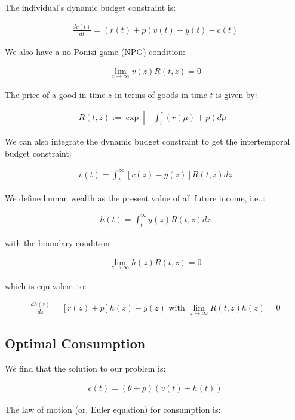 \documentclass[10pt]{article}
\begin{document}
The individual's dynamic budget constraint is:

\begin{align}
    \frac{d v(t)}{d t}=(r(t)+p) v(t)+y(t)-c(t)
\end{align}

We also have a no-Ponizi-game (NPG) condition:

\begin{align}
    \lim _{z \rightarrow \infty} v(z) R(t, z)=0
\end{align}

The price of a good in time $z$ in terms of goods in time $t$ is
given by:

\begin{align}
    R(t, z):=\exp \left[-\int_t^z(r(\mu)+p) d \mu\right]
\end{align}

We can also integrate the dynamic budget constraint to get
the intertemporal budget constraint:

\begin{align}
    v(t)=\int_t^{\infty}[c(z)-y(z)] R(t, z) d z
\end{align}

We define human wealth as the present value of 
all future income, i.e.,:

\begin{align}
    h(t)=\int_t^{\infty} y(z) R(t, z) d z
\end{align}

with the boundary condition

\begin{align}
    \lim _{z \rightarrow \infty} h(z) R(t, z)=0
\end{align}

which is equivalent to:

\begin{align}
    \frac{d h(z)}{d z}=[r(z)+p] h(z)-y(z) \text { with } \lim _{z \rightarrow \infty} R(t, z) h(z)=0
\end{align}

\subsection{Optimal Consumption}

We find that the solution to our problem is:

\begin{align}
    c(t)=(\theta+p)(v(t)+h(t))
\end{align}

The law of motion (or, Euler equation) for consumption is:
\end{document}
